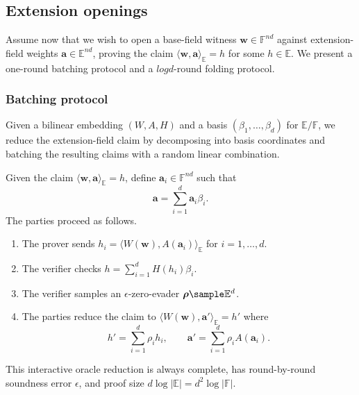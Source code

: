 \documentclass[11pt,letterpaper,usenames,dvipsnames]{article}
\begin{document}
\subsection{Extension openings}

Assume now that we wish to open a base-field witness $\mathbf{w} \in \mathbb{F}^{nd}$ against extension-field weights $\mathbf{a} \in \mathbb{E}^{n d}$, proving the claim $\langle \mathbf{w}, \mathbf{a}\rangle_\mathbb{E} = h$ for some $h \in \mathbb{E}$. We present a one-round batching protocol and a $log d$-round folding protocol.

\subsubsection{Batching protocol}
Given a bilinear embedding $(W, A, H)$ and a basis $(\beta_1, \dots, \beta_d)$ for $\mathbb{E}/\mathbb{F}$, we reduce the extension-field claim by decomposing into basis coordinates and batching     the resulting claims with a random linear combination.

\begin{construction}
Given the claim $\langle \mathbf{w}, \mathbf a\rangle_\mathbb{E}=h$, define $\mathbf{a}_i \in \mathbb{F}^{nd}$ such that 
\[
\mathbf{a} = \sum_{i=1}^d \mathbf{a}_i \beta_i \text{.}
\]
The parties proceed as follows.
\begin{enumerate}
    \item The prover sends $h_i = \langle W(\mathbf{w}), A(\mathbf{a}_i) \rangle_{\mathbb{E}}$  for $i=1,\ldots,d$.
    \item The verifier checks $h = \sum_{i=1}^{d} H(h_i) \beta_i$.
    \item The verifier samples an $\epsilon$-zero-evader $\boldsymbol{\rho} \sample\mathbb E^d$.
    \item The parties reduce the claim to $\langle W(\mathbf{w}), \mathbf a'\rangle_\mathbb{E}=h'$ where 
    \[
    h' = \sum_{i=1}^{d} \rho_i h_i,
    \qquad
    \mathbf{a}' = \sum_{i=1}^{d} \rho_i  A(\mathbf{a}_i) \text{.}
    \]
\end{enumerate}
This interactive oracle reduction is always complete, has round-by-round soundness error $\epsilon$, and proof size $d \log |\mathbb{E}| = d^2 \log |\mathbb{F}|$.
\end{construction}
\end{document}
